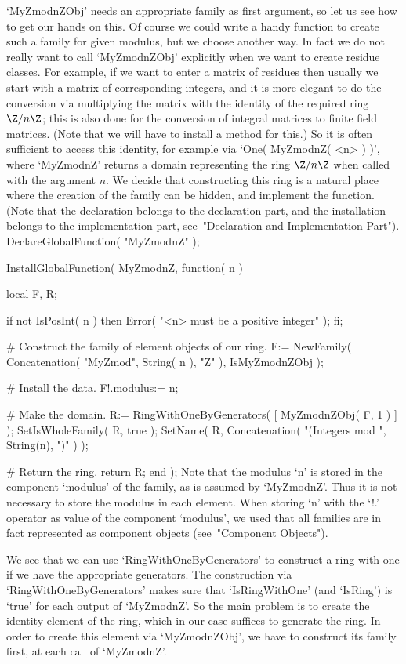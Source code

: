 `MyZmodnZObj' needs an appropriate family as first argument,
so let us see how to get our hands on this.
Of course we could write a handy function to create such a family
for given modulus, but we choose another way.
In fact we do not really want to call `MyZmodnZObj' explicitly when we
want to create residue classes.
For example, if we want to enter a matrix of residues then usually
we start with a matrix of corresponding integers,
and it is more elegant to do the conversion via multiplying the matrix
with the identity of the required ring $\Z/n\Z$;
this is also done for the conversion of integral matrices to
finite field matrices.
(Note that we will have to install a method for this.)
So it is often sufficient to access this identity,
for example via `One( MyZmodnZ( <n> ) )',
where `MyZmodnZ' returns a domain representing the ring $\Z/n\Z$
when called with the argument $n$.
We decide that constructing this ring is a natural place where the
creation of the family can be hidden,
and implement the function.
(Note that the declaration belongs to the declaration part,
and the installation belongs to the implementation part,
see~"Declaration and Implementation Part").
\begintt
DeclareGlobalFunction( "MyZmodnZ" );

InstallGlobalFunction( MyZmodnZ, function( n )

    local F, R;

    if not IsPosInt( n ) then
      Error( "<n> must be a positive integer" );
    fi;

    # Construct the family of element objects of our ring.
    F:= NewFamily( Concatenation( "MyZmod", String( n ), "Z" ),
                   IsMyZmodnZObj );

    # Install the data.
    F!.modulus:= n;

    # Make the domain.
    R:= RingWithOneByGenerators( [ MyZmodnZObj( F, 1 ) ] );
    SetIsWholeFamily( R, true );
    SetName( R, Concatenation( "(Integers mod ", String(n), ")" ) );

    # Return the ring.
    return R;
end );
\endtt
Note that the modulus `n' is stored in the component `modulus' of the
family, as is assumed by `MyZmodnZ'.
Thus it is not necessary to store the modulus in each element.
When storing `n' with the `!.' operator as value of the component
`modulus', we used that all families are in fact represented as
component objects (see~"Component Objects").

We see that we can use `RingWithOneByGenerators' to construct a ring
with one if we have the appropriate generators.
The construction via `RingWithOneByGenerators' makes sure
that `IsRingWithOne' (and `IsRing') is `true' for each output of `MyZmodnZ'.
So the main problem is to create the identity element of the ring,
which in our case suffices to generate the ring.
In order to create this element via `MyZmodnZObj',
we have to construct its family first, at each call of `MyZmodnZ'.

